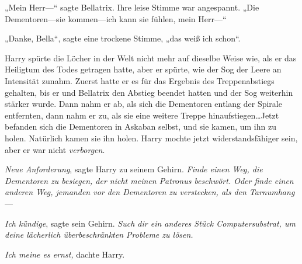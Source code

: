 „Mein Herr—“ sagte Bellatrix. Ihre leise Stimme war angespannt.
„Die Dementoren—sie kommen—ich kann sie fühlen, mein Herr—“

„Danke, Bella“, sagte eine trockene Stimme, „das weiß ich schon“.

Harry spürte die Löcher in der Welt nicht mehr auf dieselbe Weise wie, als er das Heiligtum des Todes getragen hatte, aber er spürte, wie der Sog der Leere an Intensität zunahm. Zuerst hatte er es für das Ergebnis des Treppenabstiegs gehalten, bis er und Bellatrix den Abstieg beendet hatten und der Sog weiterhin stärker wurde. Dann nahm er ab, als sich die Dementoren entlang der Spirale entfernten, dann nahm er zu, als sie eine weitere Treppe hinaufstiegen…Jetzt befanden sich die Dementoren in Askaban selbst, und sie kamen, um ihn zu holen. Natürlich kamen sie ihn holen. Harry mochte jetzt widerstandsfähiger sein, aber er war nicht \emph{verborgen}.

\emph{Neue Anforderung}, sagte Harry zu seinem Gehirn. \emph{Finde einen Weg, die Dementoren zu besiegen, der nicht meinen Patronus beschwört. Oder finde einen anderen Weg, jemanden vor den Dementoren zu verstecken, als den Tarnumhang}—

\emph{Ich kündige}, sagte sein Gehirn. \emph{Such dir ein anderes Stück Computersubstrat, um deine lächerlich überbeschränkten Probleme zu lösen.}

\emph{Ich meine es ernst,} dachte Harry.

